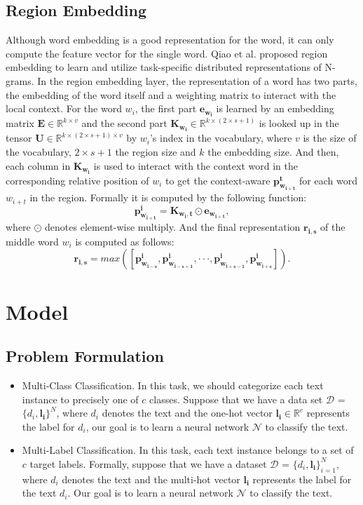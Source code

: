 \documentclass[letterpaper]{article} \usepackage{aaai19}  \usepackage{times}  \usepackage{helvet}  \usepackage{courier}  \usepackage{url}  \usepackage{graphicx}
\begin{document}
\subsection{Region Embedding}
Although word embedding is a good representation for the word, it can only compute the feature vector for the single word. Qiao et al.  proposed region embedding to learn and utilize task-specific distributed representations of N-grams. In the region embedding layer, the representation of a word has two
parts, the embedding of the word itself and a weighting matrix to interact with the local context. For the word $w_{i}$, the first part $\mathbf{e_{w_{i}}}$ is learned by an embedding matrix $\mathbf{E} \in \mathbb{R}^{k \times v}$ and the second part $\mathbf{K_{w_{i}}} \in \mathbb{R}^{k\times(2\times s+1)}$ is looked up in the tensor $\mathbf{U} \in \mathbb{R}^{k\times(2 \times s + 1)\times v}$ by $w_{i}$'s index in the vocabulary, where $v$ is the size of the vocabulary, $2 \times s + 1$ the region size and $k$ the embedding size. And then, each column in $\mathbf{K_{w_{i}}}$ is used to interact with the context word in the corresponding relative position of $w_{i}$ to get the context-aware $\mathbf{p^{t}_{w_{i+t}}}$ for each word $w_{i+t}$ in the region. Formally it is computed by the following function:
\begin{equation}
\mathbf{p^{i}_{w_{i+t}} = K_{w_{i},t} \odot \mathbf{e_{w_{i+t}}}},
\end{equation}
where $\odot$ denotes element-wise multiply.
And the final representation $\mathbf{r_{i,s}}$ of the middle word $w_{i}$ is computed as follows:
\begin{equation}
\mathbf{r_{i,s}} = max\mathbf{([p^{i}_{w_{i-s}}, p^{i}_{w_{i-s+1}}, \cdot \cdot \cdot, p^{i}_{w_{i+s-1}}, p^{i}_{w_{i+s}}])}.
\end{equation}

\section{Model}
\subsection{Problem Formulation}
\begin{itemize}
\item Multi-Class Classification. 
In this task, we should categorize each text instance to precisely one of $c$ classes. Suppose that we have a data set $\mathcal{D}$ = $\{d_{i},\mathbf{l_{i}}\}^{N}$, where $d_{i}$ denotes the text and the one-hot vector $\mathbf{l_{i}} \in \mathbb{R}^{c}$ represents the label for $d_{i}$, our goal is to learn a neural network $\mathcal{N}$ to classify the text.
\item Multi-Label Classification. 
In this task, each text instance belongs to a set of $c$ target labels. Formally, suppose that we have a dataset $\mathcal{D}$ = $\{d_{i},\mathbf{l_{i}}\}_{i=1}^{N}$, where $d_{i}$ denotes the text and the multi-hot vector $\mathbf{l_{i}}$ represents the label for the text $d_{i}$. Our goal is to learn a neural network $\mathcal{N}$ to classify the text. 
\end{itemize}
\end{document}
